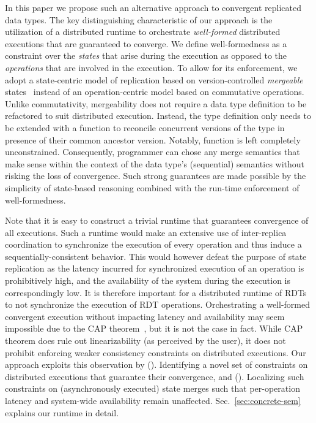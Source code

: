 In this paper we propose such an alternative approach to convergent
replicated data types. The key distinguishing characteristic of our
approach is the utilization of a distributed runtime to orchestrate
\emph{well-formed} distributed executions that are guaranteed to
converge. We define well-formedness as a constraint over the
\emph{states} that arise during the execution as opposed to the
\emph{operations} that are involved in the execution. To allow for its
enforcement, we adopt a state-centric model of replication based on
version-controlled \emph{mergeable} states~\cite{mrdt} instead of an
operation-centric model based on commutative operations. Unlike
commutativity, mergeability does not require a data type definition to
be refactored to suit distributed execution. Instead, the type
definition only needs to be extended with a  function to
reconcile concurrent versions of the type in presence of their common
ancestor version. Notably,  function is left completely
unconstrained. Consequently, programmer can chose any merge semantics
that make sense within the context of the data type's (sequential)
semantics without risking the loss of convergence. Such strong
guarantees are made possible by the simplicity of state-based
reasoning combined with the run-time enforcement of well-formedness. 


Note that it is easy to construct a trivial runtime that guarantees
convergence of all executions.  Such a runtime would make an extensive
use of inter-replica coordination to synchronize the execution of
every operation and thus induce a sequentially-consistent behavior.
This would however defeat the purpose of state replication as the
latency incurred for synchronized execution of an operation is
prohibitively high, and the availability of the system during the
execution is correspondingly low. It is therefore important for a
distributed runtime of RDTs to not synchronize the execution of RDT
operations. Orchestrating a well-formed convergent execution without
impacting latency and availability may seem impossible due to the CAP
theorem~\cite{cap}, but it is not the case in fact. While CAP theorem
does rule out linearizability (as perceived by the user), it does not
prohibit enforcing weaker consistency constraints on distributed
executions. Our approach exploits this observation by ().
Identifying a novel set of constraints on distributed executions that
guarantee their convergence, and (). Localizing such
constraints on (asynchronously executed) state merges such that
per-operation latency and system-wide availability remain unaffected.
Sec.~\ref{sec:concrete-sem} explains our runtime in detail.

